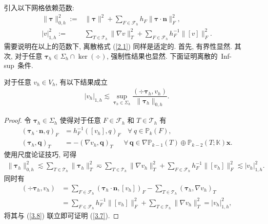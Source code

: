 引入以下网格依赖范数:
\begin{align*}
\|\boldsymbol\tau\|^2_{0,h}:=&\|\boldsymbol\tau\|^2+\sum_{F\in\mathcal{F}_h}h_F\|\boldsymbol\tau\cdot\boldsymbol{n}\|^2_{F},\\
|v|^2_{1,h}:=&\sum_{T\in\mathcal{T}_h}\|\nabla v\|^2_{T}+\sum_{F\in\mathcal{F}_h}h_F^{-1}\|[v]\|^2_{F}.
\end{align*}
需要说明在以上的范数下, 离散格式 (\ref{2.1}) 同样是适定的. 首先, 有界性显然. 其次, 对于任意 $\boldsymbol\tau_h\in\Sigma_h\cap\ker(\div)$, 强制性结果也显然. 下面证明离散的~Inf-sup~条件.
\begin{lemma}
对于任意 $v_h\in V_h$, 有以下结果成立
\begin{align}
\label{3.7}
|v_h|_{1,h}\lesssim\sup_{\boldsymbol\tau_h\in \Sigma_h}\dfrac{(\div\boldsymbol\tau_h, v_h)}{\|\boldsymbol\tau_h\|_{0,h}}.
\end{align}
\end{lemma}
\begin{proof}
令 $\boldsymbol\tau_h\in\Sigma_h$ 使得对于任意 $F\in\mathcal{F}_h$ 和 $T\in\mathcal{T}_h$ 有
\begin{align*}
(\boldsymbol\tau_h\cdot\boldsymbol{n}, q)_F&=h_F^{-1}([v_h], q)_F \quad \forall \ q\in\mathbb{P}_k(F),\\
(\boldsymbol\tau_h, \boldsymbol{q})_T&
=-(\nabla v_h, \boldsymbol{q})_T \quad\;\; \forall \, \boldsymbol{q}\in\nabla\mathbb{P}_{k-1}(T)\oplus\mathbb{P}_{k-2}(T;\mathbb K)\boldsymbol{x}.
\end{align*}
使用尺度论证技巧, 可得
\begin{align}
\label{3.8}
\|\boldsymbol\tau_h\|^2_{0,h}\lesssim\sum_{T\in\mathcal{T}_h}\|\boldsymbol\tau_h\|^2_{T}\eqsim\sum_{T\in\mathcal{T}_h}\|\nabla v_h\|^2_{T}+\sum_{F\in\mathcal{F}_h}h_F^{-1}\|[v_h]\|^2_{F}\lesssim|v_h|^2_{1,h}.
\end{align}
同时有
\begin{align*}
(\div\boldsymbol\tau_h, v_h)&=\sum_{F\in\mathcal{F}_h}(\boldsymbol\tau_h\cdot\boldsymbol{n}, [v_h])_F-\sum_{T\in\mathcal{T}_h}(\boldsymbol\tau_h, \nabla v_h)_T\\
&=\sum_{F\in\mathcal{F}_h}h_F^{-1}\|[v_h]\|^2_{F}+\sum_{T\in\mathcal{T}_h}\|\nabla v_h\|^2_{T}=|v_h|^2_{1,h},
\end{align*}
将其与 (\ref{3.8}) 联立即可证明 (\ref{3.7}).
\end{proof}

